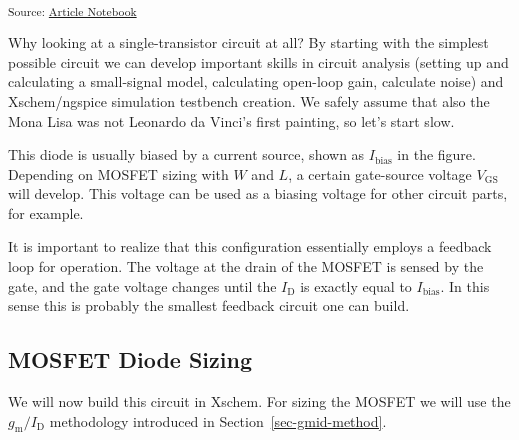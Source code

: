 \documentclass[
  a4paper,
  DIV=11,
  numbers=noendperiod]{scrartcl}
\begin{document}
\textsubscript{Source:
\href{https://iic-jku.github.io/analog-circuit-design/index.qmd.html}{Article
Notebook}}

Why looking at a single-transistor circuit at all? By starting with the
simplest possible circuit we can develop important skills in circuit
analysis (setting up and calculating a small-signal model, calculating
open-loop gain, calculate noise) and Xschem/ngspice simulation testbench
creation. We safely assume that also the Mona Lisa was not Leonardo da
Vinci's first painting, so let's start slow.

This diode is usually biased by a current source, shown as
\(I_\mathrm{bias}\) in the figure. Depending on MOSFET sizing with \(W\)
and \(L\), a certain gate-source voltage \(V_\mathrm{GS}\) will develop.
This voltage can be used as a biasing voltage for other circuit parts,
for example.

\begin{tcolorbox}[enhanced jigsaw, breakable, title=\textcolor{quarto-callout-note-color}{\faInfo}\hspace{0.5em}{Feedback in the MOSFET Diode}, left=2mm, bottomrule=.15mm, opacitybacktitle=0.6, opacityback=0, colframe=quarto-callout-note-color-frame, leftrule=.75mm, bottomtitle=1mm, colbacktitle=quarto-callout-note-color!10!white, toprule=.15mm, rightrule=.15mm, toptitle=1mm, titlerule=0mm, arc=.35mm, colback=white, coltitle=black]

It is important to realize that this configuration essentially employs a
feedback loop for operation. The voltage at the drain of the MOSFET is
sensed by the gate, and the gate voltage changes until the
\(I_\mathrm{D}\) is exactly equal to \(I_\mathrm{bias}\). In this sense
this is probably the smallest feedback circuit one can build.

\end{tcolorbox}

\subsection{MOSFET Diode Sizing}\label{mosfet-diode-sizing}

We will now build this circuit in Xschem. For sizing the MOSFET we will
use the \(g_\mathrm{m}/I_\mathrm{D}\) methodology introduced in
Section~\ref{sec-gmid-method}.
\end{document}
